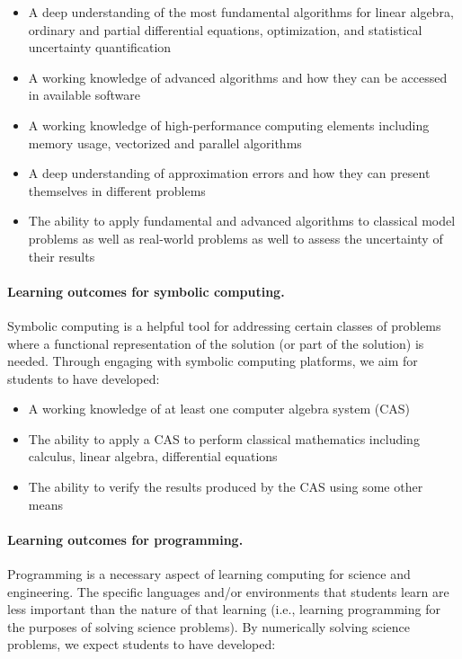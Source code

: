\documentclass[%
oneside,                 %
final,                   %
10pt]{article}
\begin{document}
\begin{itemize}
\item A deep understanding of the most fundamental algorithms for linear algebra, ordinary and partial differential equations, optimization, and statistical uncertainty quantification

\item A working knowledge of advanced algorithms and how they can be accessed in available software

\item A working knowledge of high-performance computing elements including memory usage, vectorized and parallel algorithms

\item A deep understanding of approximation errors and how they can present themselves in different problems

\item The ability to apply fundamental and advanced algorithms to classical model problems as well as real-world problems as well to assess the uncertainty of their results
\end{itemize}

\noindent
\paragraph{Learning outcomes for symbolic computing.}
Symbolic computing is a helpful tool for addressing certain classes of problems where a functional representation of the solution (or part of the solution) is needed. Through engaging with symbolic computing platforms, we aim for students to have developed:

\begin{itemize}
\item A working knowledge of at least one computer algebra system (CAS)

\item The ability to apply a CAS to perform classical mathematics including calculus, linear algebra, differential equations

\item The ability to verify the results produced by the CAS using some other means
\end{itemize}

\noindent
\paragraph{Learning outcomes for programming.}
Programming is a necessary aspect of learning computing for science and engineering. The specific languages and/or environments that students learn are less important than the nature of that learning (i.e., learning programming for the purposes of solving science problems). By numerically solving science problems, we expect students to have developed:
\end{document}
